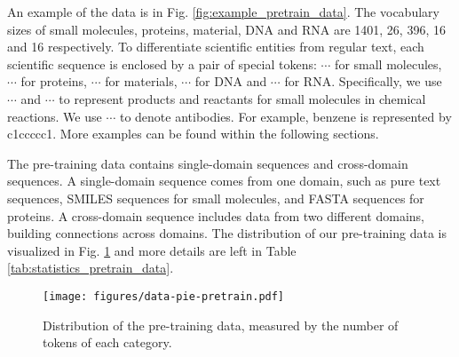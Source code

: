 An example of the data is in Fig. \ref{fig:example_pretrain_data}. The vocabulary sizes of small molecules, proteins, material, DNA and RNA are 1401, 26, 396, 16 and 16 respectively. To differentiate scientific entities from regular text, each scientific sequence is enclosed by a pair of special tokens: \mol{}$\cdots$\emol{} for small molecules, \pro{}$\cdots$\epro{} for proteins, \material{}$\cdots$\ematerial{} for materials, \dna{}$\cdots$\edna{} for DNA and \rna{}$\cdots$\erna{} for RNA. Specifically, we use \product{}$\cdots$\eproduct{} and \reactant{}$\cdots$\ereactant{} to represent products and reactants for small molecules in chemical reactions. We use \ant{}$\cdots$\eant{} to denote antibodies. For example, benzene is represented by \mol{}c1ccccc1\emol{}. More examples can be found within the following sections.

The pre-training data contains single-domain sequences and cross-domain sequences. A single-domain sequence comes from one domain, such as pure text sequences, SMILES sequences for small molecules, and FASTA sequences for proteins. A cross-domain sequence includes data from two different domains, building connections across domains. The distribution of our pre-training data is visualized in Fig. \ref{fig:pretrain_data_pie} and more details are left in Table \ref{tab:statistics_pretrain_data}. 

\begin{figure}[!htpb]
\centering
\texttt{[image: figures/data-pie-pretrain.pdf]}
\caption{Distribution of the pre-training data, measured by the number of tokens of each category.}
\label{fig:pretrain_data_pie}
\end{figure}

